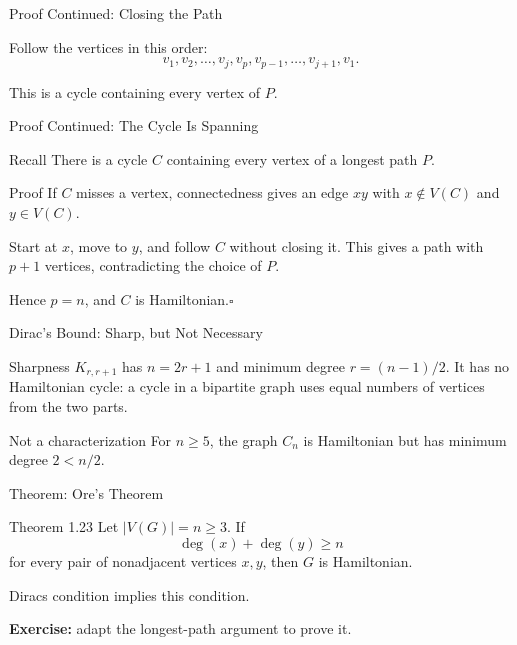 \documentclass[aspectratio=169,11pt]{beamer}
\begin{document}
\begin{frame}{Proof Continued: Closing the Path}
\large
\begin{center}\end{center}\bigskip Follow the vertices in this order:\[v_1,v_2,\ldots,v_j,v_p,v_{p-1},\ldots,v_{j+1},v_1.\]\par This is a cycle containing every vertex of $P$.
\end{frame}

\begin{frame}{Proof Continued: The Cycle Is Spanning}
\large
\begin{block}{Recall}
There is a cycle $C$ containing every vertex of a longest path $P$.
\end{block}
\begin{block}{Proof}
\normalsize If $C$ misses a vertex, connectedness gives an edge $xy$ with $x\notin V(C)$ and $y\in V(C)$.\par\medskip Start at $x$, move to $y$, and follow $C$ without closing it. This gives a path with $p+1$ vertices, contradicting the choice of $P$.\par\medskip Hence $p=n$, and $C$ is Hamiltonian.\hfill$\square$
\end{block}

\end{frame}

\begin{frame}{Dirac's Bound: Sharp, but Not Necessary}
\large
\begin{block}{Sharpness}
$K_{r,r+1}$ has $n=2r+1$ and minimum degree $r=(n-1)/2$. It has no Hamiltonian cycle: a cycle in a bipartite graph uses equal numbers of vertices from the two parts.
\end{block}
\begin{block}{Not a characterization}
For $n\ge5$, the graph $C_n$ is Hamiltonian but has minimum degree $2<n/2$.
\end{block}

\end{frame}

\begin{frame}{Theorem: Ore's Theorem}
\large
\begin{block}{Theorem 1.23}
Let $|V(G)|=n\ge3$. If\[\deg(x)+\deg(y)\ge n\]for every pair of nonadjacent vertices $x,y$, then $G$ is Hamiltonian.
\end{block}
\medskip Dirac\textquotesingle s condition implies this condition.\par\medskip\textbf{Exercise:} adapt the longest-path argument to prove it.
\end{frame}
\end{document}
